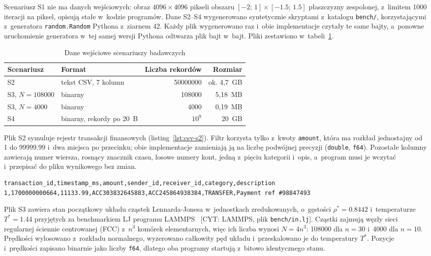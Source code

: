 Scenariusz S1 nie ma danych wejściowych: obraz $4096 \times 4096$ pikseli obszaru $[-2;\, 1] \times [\num{-1.5};\, \num{1.5}]$ płaszczyzny zespolonej, z~limitem 1000 iteracji na piksel, opisują stałe w~kodzie programów.
Dane S2--S4 wygenerowano syntetycznie skryptami z~katalogu \texttt{bench/}, korzystającymi z~generatora \texttt{random.Random} Pythona z~ziarnem 42.
Każdy plik wygenerowano raz i~obie implementacje czytały te same bajty, a~ponowne uruchomienie generatora w~tej samej wersji Pythona odtwarza plik bajt w~bajt.
Pliki zestawiono w~tabeli~\ref{tab:dane-wejsciowe}.

\begin{table}[htbp]
  \centering
  \caption{Dane wejściowe scenariuszy badawczych}
  \label{tab:dane-wejsciowe}
  \begin{tabular}{|l|l|r|r|}
    \hline
    Scenariusz & Format & Liczba rekordów & Rozmiar \\
    \hline
    S2 & tekst CSV, 7 kolumn & \num{50000000} & ok. 4,7~GB \\
    \hline
    S3, $N = \num{108000}$ & binarny & \num{108000} & 5,18~MB \\
    \hline
    S3, $N = 4000$ & binarny & 4000 & 0,19~MB \\
    \hline
    S4 & binarny, rekordy po 20~B & $10^9$ & 20~GB \\
    \hline
  \end{tabular}
\end{table}

Plik S2 symuluje rejestr transakcji finansowych (listing~\ref{lst:csv-s2}).
Filtr korzysta tylko z~kwoty \texttt{amount}, która ma rozkład jednostajny od 1 do \num{99999.99} i~dwa miejsca po przecinku; obie implementacje zamieniają ją na liczbę podwójnej precyzji (\texttt{double}, \texttt{f64}).
Pozostałe kolumny zawierają numer wiersza, rosnący znacznik czasu, losowe numery kont, jedną z~pięciu kategorii i~opis, a~program musi je wczytać i~przepisać do pliku wynikowego bez zmian.

\begin{lstlisting}[caption={Nagłówek i~pierwszy wiersz pliku wejściowego S2}, label={lst:csv-s2}]
transaction_id,timestamp_ms,amount,sender_id,receiver_id,category,description
1,1700000000664,11133.99,ACC303832645883,ACC245864938384,TRANSFER,Payment ref #98847493
\end{lstlisting}

Plik S3 zawiera stan początkowy układu cząstek Lennarda-Jonesa w~jednostkach zredukowanych, o~gęstości $\rho^* = \num{0.8442}$ i~temperaturze $T^* = \num{1.44}$ przyjętych za benchmarkiem LJ programu LAMMPS~\cite{thompson2022} [CYT: LAMMPS, plik \texttt{bench/in.lj}].
Cząstki zajmują węzły sieci regularnej ściennie centrowanej (FCC) z~$n^3$ komórek elementarnych, więc ich liczba wynosi $N = 4n^3$: \num{108000} dla $n = 30$ i~4000 dla $n = 10$.
Prędkości wylosowano z~rozkładu normalnego, wyzerowano całkowity pęd układu i~przeskalowano je do temperatury $T^*$.
Pozycje i~prędkości zapisano binarnie jako liczby \texttt{f64}, dlatego oba programy startują z~bitowo identycznego stanu.

